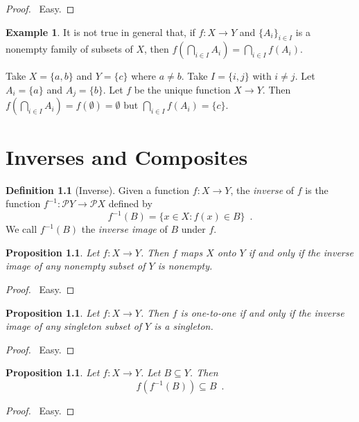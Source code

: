 \documentclass{report}
\let\qed\relax
\newtheorem{prop}[ax]{Proposition}
\theoremstyle{definition}
\newtheorem{df}[ax]{Definition}
\newtheorem{ex}[ax]{Example}
\begin{document}
\begin{proof}
\pf\ Easy. \qed
\end{proof}

\begin{ex}
It is not true in general that, if $f : X \rightarrow Y$ and $\{A_i\}_{i \in I}$ is a nonempty family of subsets of $X$, then $f \left( \bigcap_{i \in I} A_i \right) = \bigcap_{i \in I} f(A_i)$.

Take $X = \{a,b\}$ and $Y = \{c\}$ where $a \neq b$. Take $I = \{i,j\}$ with $i \neq j$. Let $A_i = \{a\}$ and $A_j = \{b\}$. Let $f$ be the unique function $X \rightarrow Y$. Then $f \left( \bigcap_{i \in I} A_i \right) = f(\emptyset) = \emptyset$ but $\bigcap_{i \in I} f(A_i) = \{c\}$.
\end{ex}

\chapter{Inverses and Composites}

\begin{df}[Inverse]
Given a function $f : X \rightarrow Y$, the \emph{inverse} of $f$ is the function $f^{-1} : \mathcal{P} Y \rightarrow \mathcal{P} X$ defined by
\[ f^{-1}(B) = \{ x \in X : f(x) \in B \} \enspace . \]
We call $f^{-1}(B)$ the \emph{inverse image} of $B$ under $f$.
\end{df}

\begin{prop}
Let $f : X \rightarrow Y$. Then $f$ maps $X$ onto $Y$ if and only if the inverse image of any nonempty subset of $Y$ is nonempty.
\end{prop}

\begin{proof}
\pf\ Easy. \qed
\end{proof}

\begin{prop}
Let $f : X \rightarrow Y$. Then $f$ is one-to-one if and only if the inverse image of any singleton subset of $Y$ is a singleton.
\end{prop}

\begin{proof}
\pf\ Easy. \qed
\end{proof}

\begin{prop}
Let $f : X \rightarrow Y$. Let $B \subseteq Y$. Then
\[ f(f^{-1}(B)) \subseteq B \enspace . \]
\end{prop}

\begin{proof}
\pf\ Easy. \qed
\end{proof}
\end{document}
